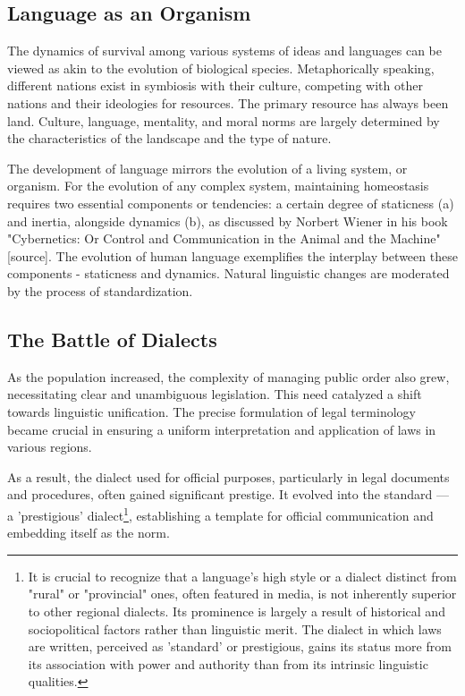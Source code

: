 \documentclass[11pt,a4]{article}
\begin{document}
\subsection{Language as an Organism}
    The dynamics of survival among various systems of ideas and languages can be viewed as akin to the evolution of biological species. Metaphorically speaking, different nations exist in symbiosis with their culture, competing with other nations and their ideologies for resources.
    The primary resource has always been land. Culture, language, mentality, and moral norms are largely determined by the characteristics of the landscape and the type of nature.

    \par
    The development of language mirrors the evolution of a living system, or organism. For the evolution of any complex system, maintaining homeostasis requires two essential components or tendencies: a certain degree of staticness (a) and inertia, alongside dynamics (b), as discussed by Norbert Wiener in his book "Cybernetics: Or Control and Communication in the Animal and the Machine" [source]. The evolution of human language exemplifies the interplay between these components - staticness and dynamics. Natural linguistic changes are moderated by the process of standardization.

    \subsection{The Battle of Dialects}
    As the population increased, the complexity of managing public order also grew, necessitating clear and unambiguous legislation. This need catalyzed a shift towards linguistic unification. The precise formulation of legal terminology became crucial in ensuring a uniform interpretation and application of laws in various regions.
    \par
    As a result, the dialect used for official purposes, particularly in legal documents and procedures, often gained significant prestige. It evolved into the standard — a 'prestigious' dialect\footnote{It is crucial to recognize that a language's high style or a dialect distinct from "rural" or "provincial" ones, often featured in media, is not inherently superior to other regional dialects. Its prominence is largely a result of historical and sociopolitical factors rather than linguistic merit. The dialect in which laws are written, perceived as 'standard' or prestigious, gains its status more from its association with power and authority than from its intrinsic linguistic qualities.}, establishing a template for official communication and embedding itself as the norm.
\end{document}
